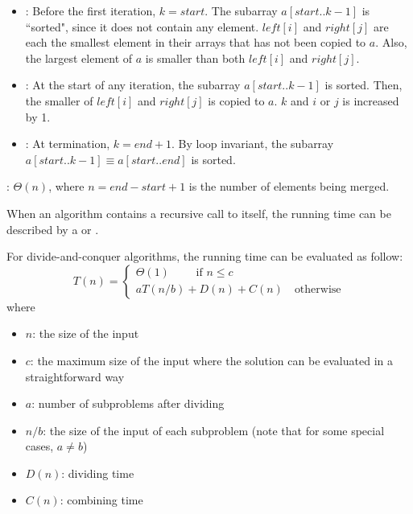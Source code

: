       \par {}
      \begin{itemize}
        \item {}: Before the first iteration, $k = start$.
          The subarray $a[start..k - 1]$ is ``sorted", since it does not contain
          any element. $left[i]$ and $right[j]$ are each the smallest element in their
          arrays that has not been copied to $a$. Also, the largest element of $a$
          is smaller than both $left[i]$ and $right[j]$.
        \item {}: At the start of any iteration, the subarray
          $a[start..k - 1]$ is sorted. Then, the smaller of $left[i]$ and $right[j]$
          is copied to $a$. $k$ and $i$ or $j$ is increased by 1.
        \item {}: At termination, $k = end + 1$. By loop invariant, the
        subarray $a[start..k - 1] \equiv a[start..end]$ is sorted.
      \end{itemize}
      \par {}: $\Theta(n)$, where $n = end - start + 1$
      is the number of elements being merged.
    
    \par When an algorithm contains a recursive call to itself, the running
    time can be described by a  or .
    \par For divide-and-conquer algorithms, the running time can be evaluated
    as follow:
    \begin{equation}
      T(n) = \begin{cases}
        \Theta(1) \qquad \mbox{ if } n \leq c \\
        a T(n / b) + D(n) + C(n) \quad \mbox {otherwise}
      \end{cases}
    \end{equation}
    where
    \begin{itemize}
      \item $n$: the size of the input
      \item $c$: the maximum size of the input where the solution can
      be evaluated in a straightforward way
      \item $a$: number of subproblems after dividing
      \item $n/b$: the size of the input of each subproblem (note that for
      some special cases, $a \neq b$)
      \item $D(n)$: dividing time
      \item $C(n)$: combining time
    \end{itemize}
  
